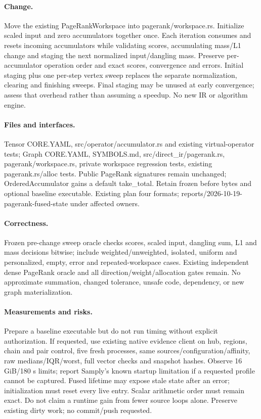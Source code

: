 \documentclass[11pt,a4paper]{article}
\begin{document}
\paragraph{Change.} Move the existing PageRankWorkspace into pagerank/workspace.rs.
Initialize scaled input and zero accumulators together once. Each iteration consumes and
resets incoming accumulators while validating scores, accumulating mass/L1 change and staging
the next normalized input/dangling mass. Preserve per-accumulator operation order and exact
scores, convergence and errors. Initial staging plus one per-step vertex sweep replaces the
separate normalization, clearing and finishing sweeps. Final staging may be unused at early
convergence; assess that overhead rather than assuming a speedup. No new IR or algorithm engine.
\paragraph{Files and interfaces.} Tensor CORE.YAML, src/operator/accumulator.rs and existing
virtual-operator tests; Graph CORE.YAML, SYMBOLS.md, src/direct\_ir/pagerank.rs,
pagerank/workspace.rs, private workspace regression tests, existing pagerank.rs/alloc tests.
Public PageRank signatures remain unchanged; OrderedAccumulator gains a default take\_total.
Retain frozen before bytes and optional baseline executable. Existing plan four formats;
reports/2026-10-19-pagerank-fused-state under affected owners.
\paragraph{Correctness.} Frozen pre-change sweep oracle checks scores, scaled input,
dangling sum, L1 and mass decisions bitwise; include weighted/unweighted, isolated, uniform
and personalized, empty, error and repeated-workspace cases. Existing independent dense
PageRank oracle and all direction/weight/allocation gates remain. No approximate summation,
changed tolerance, unsafe code, dependency, or new graph materialization.
\paragraph{Measurements and risks.} Prepare a baseline executable but do not run timing
without explicit authorization. If requested, use existing native evidence client on hub,
regions, chain and pair control, five fresh processes, same sources/configuration/affinity,
raw medians/IQR/worst, full vector checks and snapshot hashes. Observe 16 GiB/180 s limits;
report Samply's known startup limitation if a requested profile cannot be captured.
Fused lifetime may expose stale state after an error; initialization must reset every live
entry. Scalar arithmetic order must remain exact. Do not claim a runtime gain from fewer
source loops alone. Preserve existing dirty work; no commit/push requested.
\end{document}
